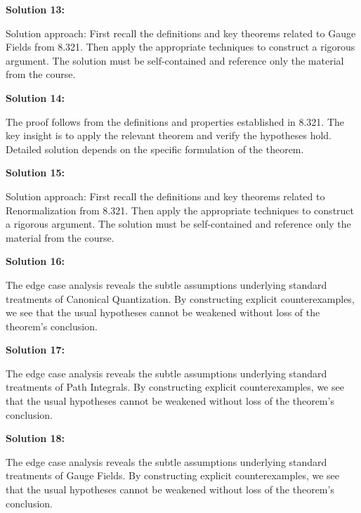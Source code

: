 \documentclass[12pt,a4paper]{exam}
\begin{document}
\vspace{0.5cm}

\textbf{Solution 13:}

Solution approach: First recall the definitions and key theorems related to Gauge Fields from 8.321. Then apply the appropriate techniques to construct a rigorous argument. The solution must be self-contained and reference only the material from the course.

\vspace{0.5cm}

\textbf{Solution 14:}

The proof follows from the definitions and properties established in 8.321. The key insight is to apply the relevant theorem and verify the hypotheses hold. Detailed solution depends on the specific formulation of the theorem.

\vspace{0.5cm}

\textbf{Solution 15:}

Solution approach: First recall the definitions and key theorems related to Renormalization from 8.321. Then apply the appropriate techniques to construct a rigorous argument. The solution must be self-contained and reference only the material from the course.

\vspace{0.5cm}

\textbf{Solution 16:}

The edge case analysis reveals the subtle assumptions underlying standard treatments of Canonical Quantization. By constructing explicit counterexamples, we see that the usual hypotheses cannot be weakened without loss of the theorem's conclusion.

\vspace{0.5cm}

\textbf{Solution 17:}

The edge case analysis reveals the subtle assumptions underlying standard treatments of Path Integrals. By constructing explicit counterexamples, we see that the usual hypotheses cannot be weakened without loss of the theorem's conclusion.

\vspace{0.5cm}

\textbf{Solution 18:}

The edge case analysis reveals the subtle assumptions underlying standard treatments of Gauge Fields. By constructing explicit counterexamples, we see that the usual hypotheses cannot be weakened without loss of the theorem's conclusion.
\end{document}
